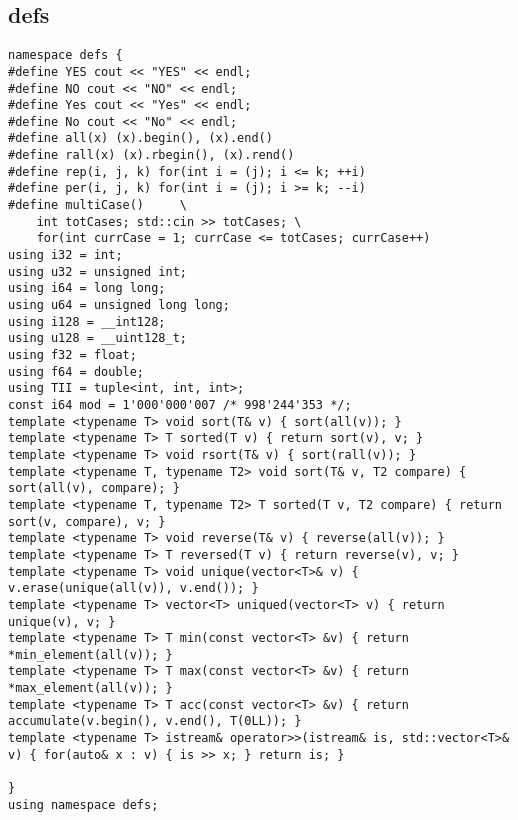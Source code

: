 \subsection{defs}
\begin{lstlisting}
namespace defs {
#define YES cout << "YES" << endl;
#define NO cout << "NO" << endl;
#define Yes cout << "Yes" << endl;
#define No cout << "No" << endl;
#define all(x) (x).begin(), (x).end()
#define rall(x) (x).rbegin(), (x).rend()
#define rep(i, j, k) for(int i = (j); i <= k; ++i)
#define per(i, j, k) for(int i = (j); i >= k; --i)
#define multiCase()     \
    int totCases; std::cin >> totCases; \
    for(int currCase = 1; currCase <= totCases; currCase++)
using i32 = int;
using u32 = unsigned int;
using i64 = long long;
using u64 = unsigned long long;
using i128 = __int128;
using u128 = __uint128_t;
using f32 = float;
using f64 = double;
using TII = tuple<int, int, int>;
const i64 mod = 1'000'000'007 /* 998'244'353 */;
template <typename T> void sort(T& v) { sort(all(v)); }
template <typename T> T sorted(T v) { return sort(v), v; }
template <typename T> void rsort(T& v) { sort(rall(v)); }
template <typename T, typename T2> void sort(T& v, T2 compare) { sort(all(v), compare); }
template <typename T, typename T2> T sorted(T v, T2 compare) { return sort(v, compare), v; }
template <typename T> void reverse(T& v) { reverse(all(v)); }
template <typename T> T reversed(T v) { return reverse(v), v; }
template <typename T> void unique(vector<T>& v) { v.erase(unique(all(v)), v.end()); }
template <typename T> vector<T> uniqued(vector<T> v) { return unique(v), v; }
template <typename T> T min(const vector<T> &v) { return *min_element(all(v)); }
template <typename T> T max(const vector<T> &v) { return *max_element(all(v)); }
template <typename T> T acc(const vector<T> &v) { return accumulate(v.begin(), v.end(), T(0LL)); }
template <typename T> istream& operator>>(istream& is, std::vector<T>& v) { for(auto& x : v) { is >> x; } return is; }

}
using namespace defs;
\end{lstlisting}


